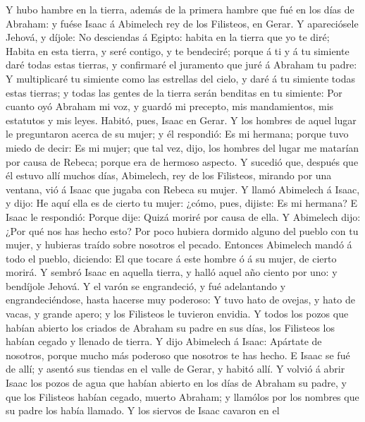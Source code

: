  Y hubo hambre en la tierra, además de la primera hambre
que fué en los días de Abraham: y fuése Isaac á Abimelech rey de los
Filisteos, en Gerar.  Y apareciósele Jehová, y díjole: No
desciendas á Egipto: habita en la tierra que yo te diré; 
Habita en esta tierra, y seré contigo, y te bendeciré; porque á ti y á
tu simiente daré todas estas tierras, y confirmaré el juramento que juré
á Abraham tu padre:  Y multiplicaré tu simiente como las
estrellas del cielo, y daré á tu simiente todas estas tierras; y todas
las gentes de la tierra serán benditas en tu simiente: 
Por cuanto oyó Abraham mi voz, y guardó mi precepto, mis mandamientos,
mis estatutos y mis leyes.  Habitó, pues, Isaac en Gerar.
 Y los hombres de aquel lugar le preguntaron acerca de su
mujer; y él respondió: Es mi hermana; porque tuvo miedo de decir: Es mi
mujer; que tal vez, dijo, los hombres del lugar me matarían por causa de
Rebeca; porque era de hermoso aspecto.  Y sucedió que,
después que él estuvo allí muchos días, Abimelech, rey de los Filisteos,
mirando por una ventana, vió á Isaac que jugaba con Rebeca su mujer.
 Y llamó Abimelech á Isaac, y dijo: He aquí ella es de
cierto tu mujer: ¿cómo, pues, dijiste: Es mi hermana? E Isaac le
respondió: Porque dije: Quizá moriré por causa de ella. 
Y Abimelech dijo: ¿Por qué nos has hecho esto? Por poco hubiera dormido
alguno del pueblo con tu mujer, y hubieras traído sobre nosotros el
pecado.  Entonces Abimelech mandó á todo el pueblo,
diciendo: El que tocare á este hombre ó á su mujer, de cierto morirá.
 Y sembró Isaac en aquella tierra, y halló aquel año
ciento por uno: y bendíjole Jehová.  Y el varón se
engrandeció, y fué adelantando y engrandeciéndose, hasta hacerse muy
poderoso:  Y tuvo hato de ovejas, y hato de vacas, y
grande apero; y los Filisteos le tuvieron envidia.  Y
todos los pozos que habían abierto los criados de Abraham su padre en
sus días, los Filisteos los habían cegado y llenado de tierra.
 Y dijo Abimelech á Isaac: Apártate de nosotros, porque
mucho más poderoso que nosotros te has hecho.  E Isaac se
fué de allí; y asentó sus tiendas en el valle de Gerar, y habitó allí.
 Y volvió á abrir Isaac los pozos de agua que habían
abierto en los días de Abraham su padre, y que los Filisteos habían
cegado, muerto Abraham; y llamólos por los nombres que su padre los
había llamado.  Y los siervos de Isaac cavaron en el
